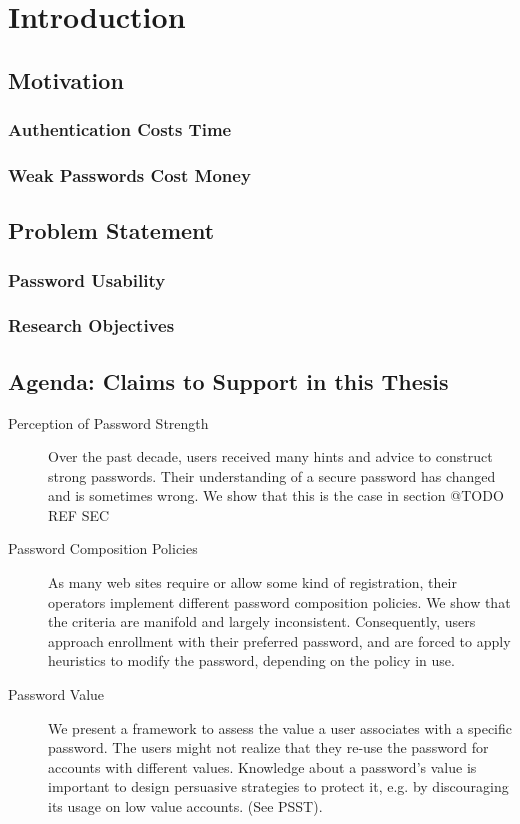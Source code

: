 
\chapter[Introduction]{Introduction}\label{chap:intro}


\section{Motivation}
\subsection{Authentication Costs Time}
\subsection{Weak Passwords Cost Money}

\section{Problem Statement}
\subsection{Password Usability}
\subsection{Research Objectives}

\section{Agenda: Claims to Support in this Thesis}

\begin{description}
\item[Perception of Password Strength] Over the past decade, users received many hints and advice to construct strong passwords. Their understanding of a secure password has changed and is sometimes wrong. We show that this is the case in section @TODO REF SEC

\item[Password Composition Policies] As many web sites require or allow some kind of registration, their operators implement different password composition policies. We show that the criteria are manifold and largely inconsistent. Consequently, users approach enrollment with their preferred password, and are forced to apply heuristics to modify the password, depending on the policy in use. 

\item[Password Value] We present a framework to assess the value a user associates with a specific password. The users might not realize that they re-use the password for accounts with different values. Knowledge about a password's value is important to design persuasive strategies to protect it, e.g. by discouraging its usage on low value accounts. (See PSST).
\end{description}




